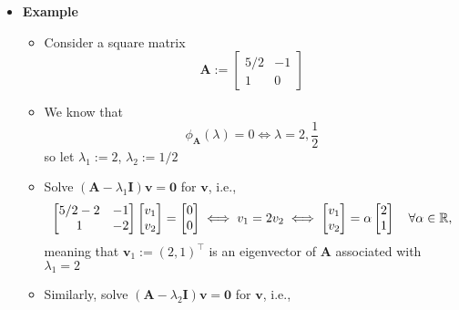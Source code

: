 \documentclass[12pt,a4paper]{article}
\begin{document}
\begin{itemize}
\item \textbf{Example}
  \begin{itemize}
  \item Consider a square matrix
    \begin{equation}\nonumber%
      \bm{A} :=
      \begin{bmatrix}
        5/2 & -1 \\
        1 & 0
      \end{bmatrix}
    \end{equation}
  \item We know that
    \begin{equation}\nonumber%
      \phi_{\bm{A}}(\lambda) = 0
      \iff
      \lambda = 2, \frac{1}{2}
    \end{equation}
    so let $\lambda_{1}:=2$, $\lambda_{2}:=1/2$
  \item Solve $(\bm{A}-\lambda_{1}\bm{I})\bm{v}=\bm{0}$ for $\bm{v}$, i.e.,
    \begin{equation}\nonumber%
      \begin{bmatrix}
        5/2-2 & -1 \\
        1 & - 2
      \end{bmatrix}
      \begin{bmatrix}
        v_{1} \\
        v_{2} \\
      \end{bmatrix}
      = 
      \begin{bmatrix}
        0 \\
        0 \\
      \end{bmatrix}
      \iff
      v_{1} = 2v_{2}
      \iff
      \begin{bmatrix}
        v_{1} \\
        v_{2} \\
      \end{bmatrix}
      =
      \alpha
      \begin{bmatrix}
        2\\
        1
      \end{bmatrix}
      \quad \forall \alpha \in \R,
    \end{equation}
    meaning that $\bm{v}_{1}:= (2, 1)^{\top}$
    is an eigenvector of $\bm{A}$ associated with $\lambda_{1}=2$
  \item Similarly, solve $(\bm{A}-\lambda_{2}\bm{I})\bm{v}=\bm{0}$ for $\bm{v}$, i.e.,
    \begin{equation}\nonumber%

\end{equation}
\end{itemize}
\end{itemize}
\end{document}
